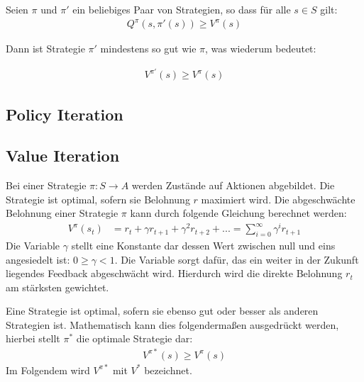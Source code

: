 \documentclass[10pt]{scrartcl}
\begin{document}
Seien $\pi$ und $\pi'$ ein beliebiges Paar von Strategien, so dass für alle $s \in S$ gilt:
\begin{align*}
Q^\pi(s,\pi'(s)) \ge V^\pi(s)
\end{align*}

Dann ist Strategie $\pi'$  mindestens so gut wie $\pi$, was wiederum bedeutet:

\begin{align*}
V^{\pi'}(s) \ge V^\pi(s)
\end{align*}

\subsection{Policy Iteration}
\subsection{Value Iteration}
Bei einer Strategie $\pi : S \rightarrow A $ werden Zustände auf Aktionen abgebildet. Die Strategie ist optimal, sofern sie Belohnung $r$ maximiert wird. Die abgeschwächte Belohnung einer Strategie $\pi$ kann durch folgende Gleichung berechnet werden:
\begin{align}\label{gleichungvp}
V^{\pi}(s_t) &= r_t + \gamma r_{t+1} + \gamma^2r_{t+2} + ... = \sum^{\infty}_{i=0} \gamma^ir_{t+1}
\end{align}
Die Variable $\gamma$ stellt eine Konstante dar dessen Wert zwischen null und eins angesiedelt ist: $0 \geq \gamma < 1$. Die Variable sorgt dafür, das ein weiter in der Zukunft liegendes Feedback abgeschwächt wird. Hierdurch wird die direkte Belohnung $r_t$ am stärksten gewichtet.

Eine Strategie ist optimal, sofern sie ebenso gut oder besser als anderen Strategien ist. 
Mathematisch kann dies folgendermaßen ausgedrückt werden, hierbei stellt $\pi^*$ die optimale Strategie dar:
\begin{align}\label{voptimal}
V^{\pi*}(s)\geq V^\pi(s)
\end{align}
Im Folgendem wird $V^{\pi*}$ mit $V^*$ bezeichnet.
\end{document}
